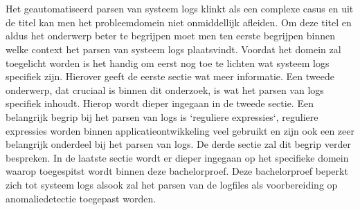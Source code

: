 
\chapter{}
\label{ch:inleiding}



Het geautomatiseerd parsen van systeem logs klinkt als een complexe casus en uit de titel kan men het probleemdomein niet onmiddellijk afleiden. Om deze titel en aldus het onderwerp beter te begrijpen moet men ten eerste begrijpen binnen welke context het parsen van systeem logs plaatsvindt. Voordat het domein zal toegelicht worden is het handig om eerst nog toe te lichten wat systeem logs specifiek zijn. Hierover geeft de eerste sectie wat meer informatie. Een tweede onderwerp, dat cruciaal is binnen dit onderzoek, is wat het parsen van logs specifiek inhoudt. Hierop wordt dieper ingegaan in de tweede sectie. Een belangrijk begrip bij het parsen van logs is `reguliere expressies`, reguliere expressies worden binnen applicatieontwikkeling veel gebruikt en zijn ook een zeer belangrijk onderdeel bij het parsen van logs. De derde sectie zal dit begrip verder bespreken. In de laatste sectie wordt er dieper ingegaan op het specifieke domein waarop toegespitst wordt binnen deze bachelorproef. Deze bachelorproef beperkt zich tot systeem logs alsook zal het parsen van de logfiles als voorbereiding op anomaliedetectie toegepast worden. 

